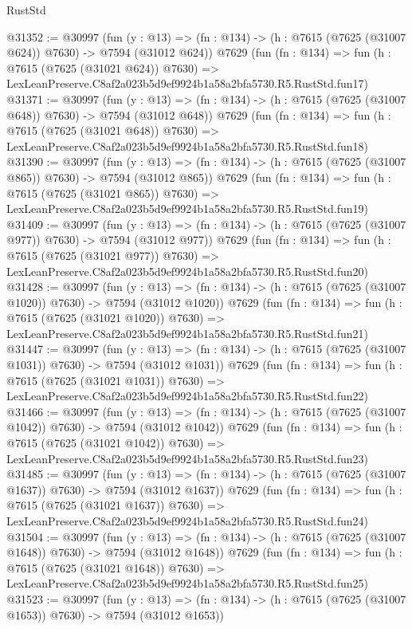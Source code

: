 \begin{lexlean}{RustStd}
\begin{coremodule}
@31352 := @30997
    (fun (y : @13) => (fn : @134) -> (h : @7615 (@7625 (@31007 @624)) @7630) -> @7594 (@31012 @624))
    @7629
    (fun (fn : @134) =>
    fun (h : @7615 (@7625 (@31021 @624)) @7630) =>
    LexLeanPreserve.C8af2a023b5d9ef9924b1a58a2bfa5730.R5.RustStd.fun17)
@31371 := @30997
    (fun (y : @13) => (fn : @134) -> (h : @7615 (@7625 (@31007 @648)) @7630) -> @7594 (@31012 @648))
    @7629
    (fun (fn : @134) =>
    fun (h : @7615 (@7625 (@31021 @648)) @7630) =>
    LexLeanPreserve.C8af2a023b5d9ef9924b1a58a2bfa5730.R5.RustStd.fun18)
@31390 := @30997
    (fun (y : @13) => (fn : @134) -> (h : @7615 (@7625 (@31007 @865)) @7630) -> @7594 (@31012 @865))
    @7629
    (fun (fn : @134) =>
    fun (h : @7615 (@7625 (@31021 @865)) @7630) =>
    LexLeanPreserve.C8af2a023b5d9ef9924b1a58a2bfa5730.R5.RustStd.fun19)
@31409 := @30997
    (fun (y : @13) => (fn : @134) -> (h : @7615 (@7625 (@31007 @977)) @7630) -> @7594 (@31012 @977))
    @7629
    (fun (fn : @134) =>
    fun (h : @7615 (@7625 (@31021 @977)) @7630) =>
    LexLeanPreserve.C8af2a023b5d9ef9924b1a58a2bfa5730.R5.RustStd.fun20)
@31428 := @30997
    (fun (y : @13) =>
    (fn : @134) -> (h : @7615 (@7625 (@31007 @1020)) @7630) -> @7594 (@31012 @1020))
    @7629
    (fun (fn : @134) =>
    fun (h : @7615 (@7625 (@31021 @1020)) @7630) =>
    LexLeanPreserve.C8af2a023b5d9ef9924b1a58a2bfa5730.R5.RustStd.fun21)
@31447 := @30997
    (fun (y : @13) =>
    (fn : @134) -> (h : @7615 (@7625 (@31007 @1031)) @7630) -> @7594 (@31012 @1031))
    @7629
    (fun (fn : @134) =>
    fun (h : @7615 (@7625 (@31021 @1031)) @7630) =>
    LexLeanPreserve.C8af2a023b5d9ef9924b1a58a2bfa5730.R5.RustStd.fun22)
@31466 := @30997
    (fun (y : @13) =>
    (fn : @134) -> (h : @7615 (@7625 (@31007 @1042)) @7630) -> @7594 (@31012 @1042))
    @7629
    (fun (fn : @134) =>
    fun (h : @7615 (@7625 (@31021 @1042)) @7630) =>
    LexLeanPreserve.C8af2a023b5d9ef9924b1a58a2bfa5730.R5.RustStd.fun23)
@31485 := @30997
    (fun (y : @13) =>
    (fn : @134) -> (h : @7615 (@7625 (@31007 @1637)) @7630) -> @7594 (@31012 @1637))
    @7629
    (fun (fn : @134) =>
    fun (h : @7615 (@7625 (@31021 @1637)) @7630) =>
    LexLeanPreserve.C8af2a023b5d9ef9924b1a58a2bfa5730.R5.RustStd.fun24)
@31504 := @30997
    (fun (y : @13) =>
    (fn : @134) -> (h : @7615 (@7625 (@31007 @1648)) @7630) -> @7594 (@31012 @1648))
    @7629
    (fun (fn : @134) =>
    fun (h : @7615 (@7625 (@31021 @1648)) @7630) =>
    LexLeanPreserve.C8af2a023b5d9ef9924b1a58a2bfa5730.R5.RustStd.fun25)
@31523 := @30997
    (fun (y : @13) =>
    (fn : @134) -> (h : @7615 (@7625 (@31007 @1653)) @7630) -> @7594 (@31012 @1653))

\end{coremodule}
\end{lexlean}
